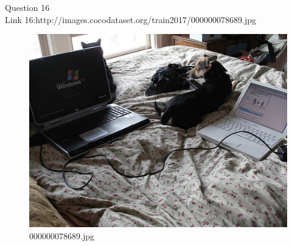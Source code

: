 Question 16\\
Link 16:http://images.cocodataset.org/train2017/000000078689.jpg
    \begin{figure}[h]
        \centering
        \includegraphics[width=0.8\linewidth]{../image set/easy/000000078689.jpg}
        \caption{000000078689.jpg}
    \end{figure}
